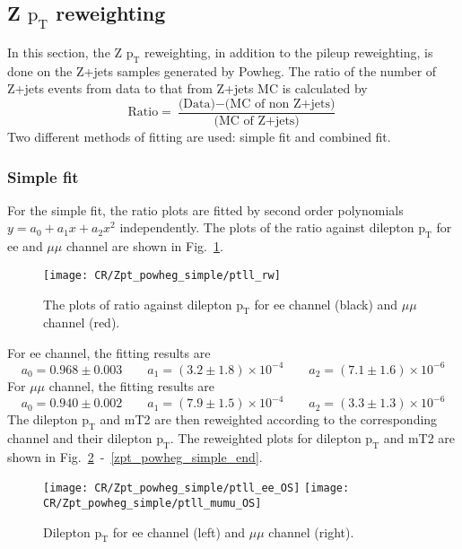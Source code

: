 \clearpage
\subsection{Z $\text{p}_{\text{T}}$ reweighting}
\label{sec_zpt}
In this section, the Z $\text{p}_{\text{T}}$ reweighting, in addition to the pileup reweighting, is done on the Z+jets samples generated by Powheg.
The ratio of the number of Z+jets events from data to that from Z+jets MC is calculated by
\begin{equation}
\text{Ratio} = \frac{\text{(Data)}-\text{(MC of non Z+jets)}}{\text{(MC of Z+jets)}}
\end{equation}
Two different methods of fitting are used: simple fit and combined fit.

\subsubsection{Simple fit}
For the simple fit, the ratio plots are fitted by second order polynomials $y = a_0 + a_1 x + a_2 x^2$ independently.
The plots of the ratio against dilepton $\text{p}_{\text{T}}$ for ee and $\mu\mu$ channel are shown in Fig.~\ref{zpt_powheg_simple}.
\begin{figure}
\centering
\texttt{[image: CR/Zpt\_powheg\_simple/ptll\_rw]}
\caption{The plots of ratio against dilepton $\text{p}_{\text{T}}$ for ee channel (black) and $\mu\mu$ channel (red).}
\label{zpt_powheg_simple}
\end{figure}
For ee channel, the fitting results are
\begin{equation}
a_0 = 0.968 \pm 0.003 \qquad
a_1 = (3.2 \pm 1.8) \times 10^{-4} \qquad
a_2 = (7.1 \pm 1.6) \times 10^{-6}
\end{equation}
For $\mu\mu$ channel, the fitting results are
\begin{equation}
a_0 = 0.940 \pm 0.002 \qquad
a_1 = (7.9 \pm 1.5) \times 10^{-4} \qquad
a_2 = (3.3 \pm 1.3) \times 10^{-6}
\end{equation}
The dilepton $\text{p}_{\text{T}}$ and mT2 are then reweighted according to the corresponding channel and their dilepton $\text{p}_{\text{T}}$.
The reweighted plots for dilepton $\text{p}_{\text{T}}$ and mT2 are shown in Fig.~\ref{zpt_powheg_simple_start}~-~\ref{zpt_powheg_simple_end}.

\begin{figure}
\texttt{[image: CR/Zpt\_powheg\_simple/ptll\_ee\_OS]}
\texttt{[image: CR/Zpt\_powheg\_simple/ptll\_mumu\_OS]}
\caption{Dilepton $\text{p}_{\text{T}}$ for ee channel (left) and $\mu\mu$ channel (right).}
\label{zpt_powheg_simple_start}
\end{figure}


